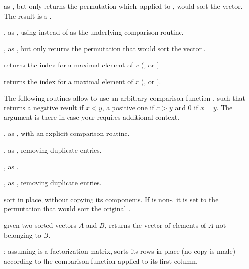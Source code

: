 
 as , but only returns the permutation
which, applied to , would sort the vector. The result is a
.

, as , using 
instead of  as the underlying comparison routine.

, as , but only
returns the permutation that would sort the vector .

 returns the index for a maximal element of $x$
(,  or ).

 returns the index for a maximal element of $x$
(,  or ).


 The following routines allow to use an
arbitrary comparison function ,
such that  returns a negative result if $x
< y$, a positive one if $x > y$ and 0 if $x = y$. The  argument is
there in case your  requires additional context.

, as
, with an explicit comparison routine.

, as
, removing duplicate entries.

,
as .

,
as , removing duplicate entries.

 sort  in place, without copying its components. If
 is non-, it is set to the permutation that would sort
the original .

 given two sorted
vectors $A$ and $B$, returns the vector of elements of $A$ not belonging to
$B$.

:
assuming  is a factorization matrix, sorts its rows in place (no copy
is made) according to the comparison function  applied to its first
column.

